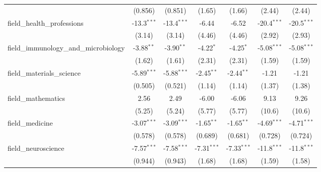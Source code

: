 \begin{tabular}{lcccccc}
                                                               & (0.856)       & (0.851)       & (1.65)        & (1.66)         & (2.44)        & (2.44)\\   
   field\_health\_professions                                  & -13.3$^{***}$ & -13.4$^{***}$ & -6.44         & -6.52          & -20.4$^{***}$ & -20.5$^{***}$\\   
                                                               & (3.14)        & (3.14)        & (4.46)        & (4.46)         & (2.92)        & (2.93)\\   
   field\_immunology\_and\_microbiology                        & -3.88$^{**}$  & -3.90$^{**}$  & -4.22$^{*}$   & -4.25$^{*}$    & -5.08$^{***}$ & -5.08$^{***}$\\   
                                                               & (1.62)        & (1.61)        & (2.31)        & (2.31)         & (1.59)        & (1.59)\\   
   field\_materials\_science                                   & -5.89$^{***}$ & -5.88$^{***}$ & -2.45$^{**}$  & -2.44$^{**}$   & -1.21         & -1.21\\   
                                                               & (0.505)       & (0.521)       & (1.14)        & (1.14)         & (1.37)        & (1.38)\\   
   field\_mathematics                                          & 2.56          & 2.49          & -6.00         & -6.06          & 9.13          & 9.26\\   
                                                               & (5.25)        & (5.24)        & (5.77)        & (5.77)         & (10.6)        & (10.6)\\   
   field\_medicine                                             & -3.07$^{***}$ & -3.09$^{***}$ & -1.65$^{**}$  & -1.65$^{**}$   & -4.69$^{***}$ & -4.71$^{***}$\\   
                                                               & (0.578)       & (0.578)       & (0.689)       & (0.681)        & (0.728)       & (0.724)\\   
   field\_neuroscience                                         & -7.57$^{***}$ & -7.58$^{***}$ & -7.31$^{***}$ & -7.33$^{***}$  & -11.8$^{***}$ & -11.8$^{***}$\\   
                                                               & (0.944)       & (0.943)       & (1.68)        & (1.68)         & (1.59)        & (1.58)\\   

\end{tabular}
